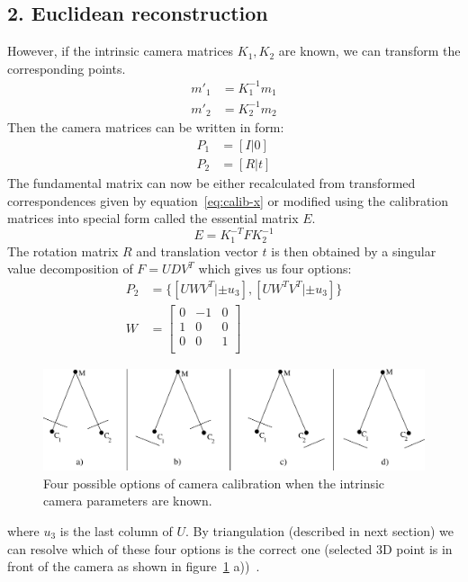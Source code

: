 \subsection*{2. Euclidean reconstruction}
However, if the intrinsic camera matrices $K_1, K_2$ are known, we can transform the corresponding points.
\begin{equation}
  \begin{aligned}
	m'_1 &= K_1^{-1} m_1 \\
	m'_2 &= K_2^{-1} m_2
  \end{aligned}
	\label{eq:calib-x}
\end{equation}
Then the camera matrices can be written in form:
\begin{equation}
  \begin{aligned}
	P_1 &= [I|0] \\
	P_2 &= [R|t] 
  \end{aligned}
\end{equation}
The fundamental matrix can now be either recalculated from transformed correspondences given by equation~\ref{eq:calib-x} or modified using the calibration matrices into special form called the essential matrix $E$.
\begin{equation}
	E = K_1^{-T} F K_2^{-1}
\end{equation}
The rotation matrix $R$ and translation vector $t$ is then obtained by a singular value decomposition of $F = UDV^T$ which gives us four options:
\begin{equation}
  \begin{aligned}
	P_2 &= \{[UWV^T | \pm u_3], [UW^T V^T | \pm u_3]\} \\
	W &= 
	\begin{bmatrix}
		0 & -1 & 0 \\	
		1 & 0 & 0 \\	
		0 & 0 & 1 \\	
	\end{bmatrix}
  \end{aligned}
\end{equation}
\begin{figure}[!htbp]
	\begin{center}
		\includegraphics[keepaspectratio,width=\textwidth]{fig/calibration-options.pdf}
	\end{center}
	\caption{Four possible options of camera calibration when the intrinsic camera parameters are known.}
	\label{fig:caliboptions}
\end{figure}
where $u_3$ is the last column of $U$. By triangulation (described in next section) we can resolve which of these four options is the correct one (selected 3D point is in front of the camera as shown in figure~\ref{fig:caliboptions} a))~\cite{cvfx, elements-of-computer-vision, book:multiple_view_geometry}.


